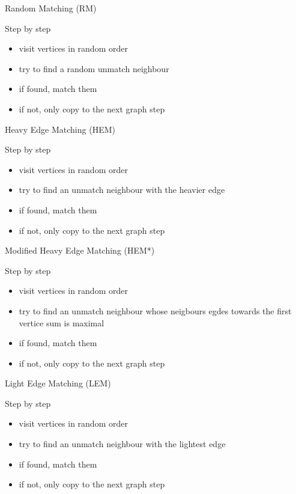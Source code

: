 \documentclass{beamer}
\begin{document}
	
	\begin{frame}{Random Matching (RM)}
		\begin{block}{Step by step}
			\begin{itemize}
				\item visit vertices in random order
				\item try to find a random unmatch neighbour
				\item if found, match them
				\item if not, only copy to the next graph step
			\end{itemize}
		\end{block}
	\end{frame}
	
	
	\begin{frame}{Heavy Edge Matching (HEM)}
		\begin{block}{Step by step}
			\begin{itemize}
				\item visit vertices in random order
				\item try to find an unmatch neighbour with the heavier edge
				\item if found, match them
				\item if not, only copy to the next graph step
			\end{itemize}
		\end{block}
	\end{frame}
	
	
	\begin{frame}{Modified Heavy Edge Matching (HEM*)}
		\begin{block}{Step by step}
			\begin{itemize}
				\item visit vertices in random order
				\item try to find an unmatch neighbour whose neigbours egdes towards the first vertice sum is maximal
				\item if found, match them
				\item if not, only copy to the next graph step
			\end{itemize}
		\end{block}
	\end{frame}
	
	
	\begin{frame}{Light Edge Matching (LEM)}
		\begin{block}{Step by step}
			\begin{itemize}
				\item visit vertices in random order
				\item try to find an unmatch neighbour with the lightest edge
				\item if found, match them
				\item if not, only copy to the next graph step
			\end{itemize}
		\end{block}
	\end{frame}
	
\end{document}
